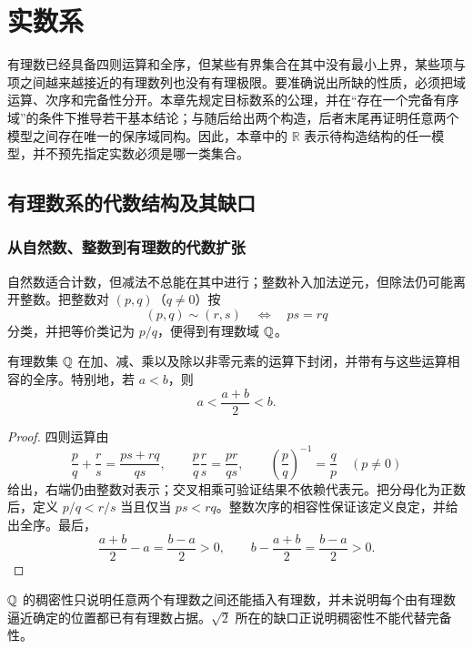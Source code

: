 \chapter{实数系}
\label{chap:real-number-system}
\label{chap:rational-defects}
\label{chap:ordered-field-completeness}
\label{chap:consequences-completeness}

有理数已经具备四则运算和全序，但某些有界集合在其中没有最小上界，某些项与项之间越来越接近的有理数列也没有有理极限。要准确说出所缺的性质，必须把域运算、次序和完备性分开。本章先规定目标数系的公理，并在“存在一个完备有序域”的条件下推导若干基本结论；与随后给出两个构造，后者末尾再证明任意两个模型之间存在唯一的保序域同构。因此，本章中的 \(\mathbb R\) 表示待构造结构的任一模型，并不预先指定实数必须是哪一类集合。

\section{有理数系的代数结构及其缺口}

\subsection{从自然数、整数到有理数的代数扩张}


自然数适合计数，但减法不总能在其中进行；整数补入加法逆元，但除法仍可能离开整数。把整数对 \((p,q)\)（\(q\ne0\)）按
\[
 (p,q)\sim(r,s)\quad\Longleftrightarrow\quad ps=rq
\]
分类，并把等价类记为 \(p/q\)，便得到有理数域 \(\mathbb{Q}\)。

\begin{proposition}
有理数集 \(\mathbb{Q}\) 在加、减、乘以及除以非零元素的运算下封闭，并带有与这些运算相容的全序。特别地，若 \(a<b\)，则
\[
 a<\frac{a+b}{2}<b.
\]
\end{proposition}

\begin{proof}
四则运算由
\[
 \frac pq+\frac rs=\frac{ps+rq}{qs},\qquad
 \frac pq\frac rs=\frac{pr}{qs},\qquad
 \left(\frac pq\right)^{-1}=\frac qp\quad(p\ne0)
\]
给出，右端仍由整数对表示；交叉相乘可验证结果不依赖代表元。把分母化为正数后，定义 \(p/q<r/s\) 当且仅当 \(ps<rq\)。整数次序的相容性保证该定义良定，并给出全序。最后，
\[
 \frac{a+b}{2}-a=\frac{b-a}{2}>0,\qquad
 b-\frac{a+b}{2}=\frac{b-a}{2}>0.
\]
\end{proof}

\begin{insightbox}[稠密与完备是两件事]
\(\mathbb{Q}\) 的稠密性只说明任意两个有理数之间还能插入有理数，并未说明每个由有理数逼近确定的位置都已有有理数占据。\(\sqrt2\) 所在的缺口正说明稠密性不能代替完备性。
\end{insightbox}

